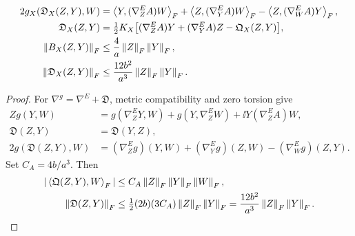 \begin{theorem}
\label{thm:levi-civita}
\begin{align}
2g_X(\mathfrak D_X(Z,Y),W)
&=\left\langle Y,(\nabla^E_ZA)W\right\rangle_F
+\left\langle Z,(\nabla^E_YA)W\right\rangle_F
-\left\langle Z,(\nabla^E_WA)Y\right\rangle_F,\\
\mathfrak D_X(Z,Y)
&=\tfrac12 K_X\bigl[
(\nabla^E_ZA)Y+(\nabla^E_YA)Z-\mathfrak Q_X(Z,Y)\bigr],\\
\left\lVert B_X(Z,Y)\right\rVert_F&\leq\frac4a\left\lVert Z\right\rVert_F\left\lVert Y\right\rVert_F,\\
\left\lVert\mathfrak D_X(Z,Y)\right\rVert_F
&\leq\frac{12b^2}{a^3}\left\lVert Z\right\rVert_F\left\lVert Y\right\rVert_F .
\label{eq:rigid-connection-tensor}
\end{align}
\end{theorem}
\begin{proof}
For $\nabla^g=\nabla^E+\mathfrak D$, metric compatibility and zero torsion give
\begin{align}
Zg(Y,W)
&=g(\nabla^E_ZY,W)+g(Y,\nabla^E_ZW)
+\ii Y{(\nabla^E_ZA)W},\\
\mathfrak D(Z,Y)&=\mathfrak D(Y,Z),\\
2g(\mathfrak D(Z,Y),W)
&=(\nabla^E_Zg)(Y,W)+(\nabla^E_Yg)(Z,W)
-(\nabla^E_Wg)(Z,Y).
\end{align}
Set $C_A=4b/a^3$. Then
\begin{align}
|\left\langle\mathfrak Q(Z,Y),W\right\rangle_F|
&\leq C_A\left\lVert Z\right\rVert_F\left\lVert Y\right\rVert_F\left\lVert W\right\rVert_F,\\
\left\lVert\mathfrak D(Z,Y)\right\rVert_F
&\leq\tfrac12(2b)(3C_A)\left\lVert Z\right\rVert_F\left\lVert Y\right\rVert_F
=\frac{12b^2}{a^3}\left\lVert Z\right\rVert_F\left\lVert Y\right\rVert_F .
\end{align}
\end{proof}



